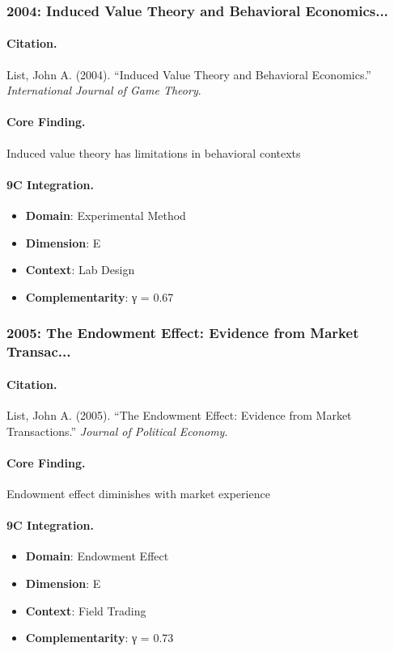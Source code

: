 \subsubsection{2004: Induced Value Theory and Behavioral Economics...}

\paragraph{Citation.}
List, John A. (2004). ``Induced Value Theory and Behavioral Economics.''
\textit{International Journal of Game Theory}.

\paragraph{Core Finding.}
Induced value theory has limitations in behavioral contexts

\paragraph{9C Integration.}
\begin{itemize}[nosep]
  \item \textbf{Domain}: Experimental Method
  \item \textbf{Dimension}: E
  \item \textbf{Context}: Lab Design
  \item \textbf{Complementarity}: γ = 0.67
\end{itemize}


\subsubsection{2005: The Endowment Effect: Evidence from Market Transac...}

\paragraph{Citation.}
List, John A. (2005). ``The Endowment Effect: Evidence from Market Transactions.''
\textit{Journal of Political Economy}.

\paragraph{Core Finding.}
Endowment effect diminishes with market experience

\paragraph{9C Integration.}
\begin{itemize}[nosep]
  \item \textbf{Domain}: Endowment Effect
  \item \textbf{Dimension}: E
  \item \textbf{Context}: Field Trading
  \item \textbf{Complementarity}: γ = 0.73
\end{itemize}


